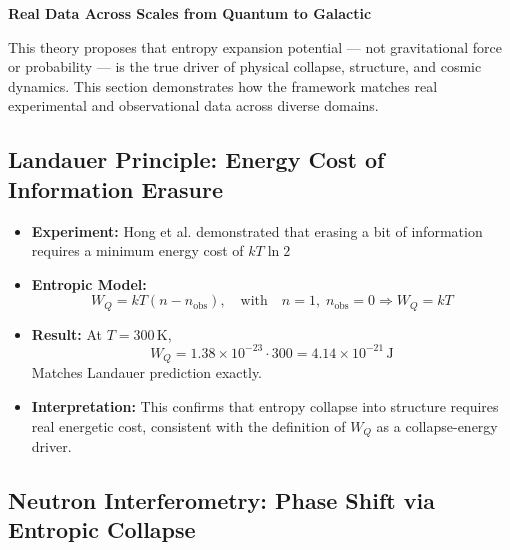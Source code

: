 \documentclass[12pt]{article}
\begin{document}
\textbf{Real Data Across Scales from Quantum to Galactic}

This theory proposes that entropy expansion potential — not gravitational force or probability — is the true driver of physical collapse, structure, and cosmic dynamics. This section demonstrates how the framework matches real experimental and observational data across diverse domains.

\subsection{Landauer Principle: Energy Cost of Information Erasure}

\begin{itemize}
    \item \textbf{Experiment:} Hong et al. demonstrated that erasing a bit of information requires a minimum energy cost of $kT \ln 2$
    \item \textbf{Entropic Model:}
    \[
    W_Q = kT(n - n_{\text{obs}}), \quad \text{with} \quad n = 1,\; n_{\text{obs}} = 0 \Rightarrow W_Q = kT
    \]
    \item \textbf{Result:} At $T = 300\, \text{K}$,
    \[
    W_Q = 1.38 \times 10^{-23} \cdot 300 = 4.14 \times 10^{-21}\, \text{J}
    \]
    Matches Landauer prediction exactly.
    
    \item \textbf{Interpretation:} This confirms that entropy collapse into structure requires real energetic cost, consistent with the definition of $W_Q$ as a collapse-energy driver.
\end{itemize}

\subsection{Neutron Interferometry: Phase Shift via Entropic Collapse}
\end{document}
